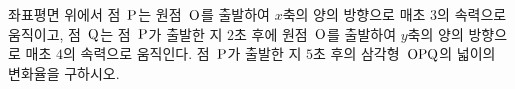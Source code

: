 좌표평면 위에서 점~$\mathrm{P}$는 원점~$\mathrm{O}$를 출발하여 $x$축의 양의 방향으로 매초 $3$의 속력으로 움직이고, 점~$\mathrm{Q}$는 점~$\mathrm{P}$가 출발한 지 $2$초 후에 원점~$\mathrm{O}$를 출발하여 $y$축의 양의 방향으로 매초 $4$의 속력으로 움직인다. 점~$\mathrm{P}$가 출발한 지 $5$초 후의 삼각형~$\mathrm{OPQ}$의 넓이의 변화율을 구하시오.
